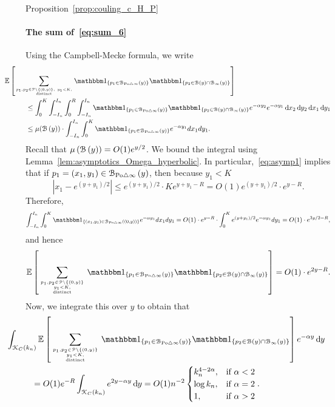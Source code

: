 \begin{proofof}{Proposition~\ref{prop:couling_c_H_P}}
\paragraph{The sum of~\eqref{eq:sum_6}}
Using the Campbell-Mecke formula, we write 
\begin{align*}
	&\hspace{-30pt}\Exp { \sum_{p_1,p_2 \in\Pcal \setminus \{(0,y)\}, \ y_1 < K, \atop \text{distinct}}
		\ind{p_1\in \BallSym{y}} \ind{p_2\in \BallHyp{y}\cap \BallPo{y}}}\\
	&\leq  \int_0^K \int_{-I_n}^{I_n}  \int_0^{R} \int_{-I_n}^{I_n}
		\ind{p_1 \in \BallSym{y}} 
 		\ind{p_2 \in \BallHyp{y}\cap \BallPo{y}} e^{-\alpha y_2} e^{-\alpha y_1} \dd x_2 \dd y_2 \dd x_1 \dd y_1  \\
 	&\leq  \mu (\BallHyp{y})\cdot \int_{-I_n}^{I_n} \int_0^K \ind{p_1 \in \BallSym{y}} 
		e^{-\alpha y_1}  dx_1 dy_1.
\end{align*}
Recall that $\mu\left({\mathcal B}\left(y\right)\right) =O(1) e^{y/2}$. We bound the integral using Lemma~\ref{lem:asymptotics_Omega_hyperbolic}. In particular,~\eqref{eq:asymp1} implies that if $p_1 = (x_1,y_1) \in {\mathcal B}_{{\mathrm{Po}} \bigtriangleup \infty}\left(y\right)$, then because $y_1 < K$
\[
	|x_1 - e^{(y+y_1)/2} |\leq e^{(y+y_1)/2} \cdot K e^{y+y_1- R} = O(1) 
	e^{(y+y_1)/2} \cdot e^{y- R}.
\]
Therefore, 
\[
	\int_{-I_n}^{I_n} \int_0^K \ind{(x_1,y_1) \in \BallSym{(0,y)}} 
	e^{-\alpha y_1}  dx_1 dy_1 = O(1) \cdot e^{y-R} 
	\cdot \int_0^K e^{(y+y_1)/2} 
	e^{-\alpha y_1}   dy_1 = O(1)\cdot e^{3y/2 - R}, 
\]
and hence
\begin{align*}
	\Exp { \sum_{{p_1,p_2 \in\Pcal \setminus \{(0,y)\} \atop y_1 < K,} \atop \text{distinct}}
	\ind{p_1\in \BallSym{y}} \ind{p_2\in \BallHyp{y}\cap \BallPo{y}}} 
	= O(1) \cdot e^{2y - R}.
\end{align*}
Now, we integrate this over $y$ to obtain that
\begin{align*}
	&\hspace{-30pt}\int_{\Kcal_{C}(k_n)} \Exp { \sum_{{p_1,p_2 \in\Pcal \setminus \{(0,y)\} \atop y_1 < K,} \atop \text{distinct}}
		\ind{p_1\in \BallSym{y}} \ind{p_2\in \BallHyp{y}\cap \BallPo{y}}} e^{-\alpha y} \dd y\\
	&= O(1) e^{-R} \int_{\Kcal_{C}(k_n)} e^{2y -\alpha y} \dd y
		= O(1) n^{-2}
			\begin{cases}
			k_n^{4-2\alpha}, & \mbox{if $\alpha < 2$} \\
			\log k_n, & \mbox{if $\alpha =2$} \\
			1, & \mbox{if $\alpha >2$}
			\end{cases}.
\end{align*}


\end{proofof}
